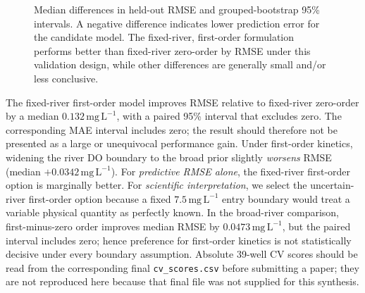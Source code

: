 \documentclass[11pt,a4paper]{article}
\newcommand{\mgL}{\mathrm{mg\,L^{-1}}}
\begin{document}
\begin{figure}[htbp]
\centering
{}
\caption{Median differences in held-out RMSE and grouped-bootstrap 95\% intervals. A negative difference indicates lower prediction error for the candidate model. The fixed-river, first-order formulation performs better than fixed-river zero-order by RMSE under this validation design, while other differences are generally small and/or less conclusive.}
\label{fig:cvforest}
\end{figure}

The fixed-river first-order model improves RMSE relative to fixed-river zero-order by a median \(0.132\,\mgL\), with a paired 95\% interval that excludes zero. The corresponding MAE interval includes zero; the result should therefore not be presented as a large or unequivocal performance gain. Under first-order kinetics, widening the river DO boundary to the broad prior slightly \emph{worsens} RMSE (median \(+0.0342\,\mgL\)). For \emph{predictive RMSE alone}, the fixed-river first-order option is marginally better. For \emph{scientific interpretation}, we select the uncertain-river first-order option because a fixed $7.5\,\mgL$ entry boundary would treat a variable physical quantity as perfectly known. In the broad-river comparison, first-minus-zero order improves median RMSE by $0.0473\,\mgL$, but the paired interval includes zero; hence preference for first-order kinetics is not statistically decisive under every boundary assumption. Absolute 39-well CV scores should be read from the corresponding final \texttt{cv\_scores.csv} before submitting a paper; they are not reproduced here because that final file was not supplied for this synthesis.
\end{document}
